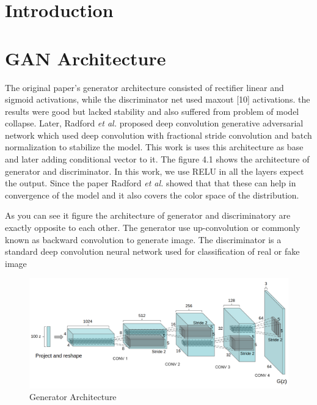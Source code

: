 
\section{Introduction}

\section{GAN Architecture} 

The original paper's\cite{Original-GAN} generator architecture consisted of  rectifier linear\cite{RELU} and sigmoid activations, while the discriminator net used maxout [10] activations. the results were good but lacked stability and also suffered from problem of model collapse.
Later, Radford \textit{et al.}\cite{DCGAN} proposed deep convolution generative adversarial network which used deep convolution with fractional stride convolution and batch normalization to stabilize the model. This work is uses this architecture as base and later adding conditional vector to it. The figure 4.1 shows the architecture of generator and discriminator. In this work, we use RELU
in all the layers expect the output. Since the paper Radford \textit{et al.}\cite{DCGAN} showed that that these can help in convergence of the model and it also covers the color space of the distribution.
\par

As you can see it figure the architecture of generator and discriminatory are exactly opposite to each other. The generator use up-convolution or commonly known as backward convolution to generate image.%
The discriminator is a standard deep convolution neural network used for classification of real or fake image
\begin{figure}
  \centering
    \includegraphics[scale=.7, angle=0]{Files/Generator-Architecture.png}
    \caption[Generator Architecture]{Generator Architecture\cite{DCGAN}}
    \label{fig: DCGAN}
\end{figure}

